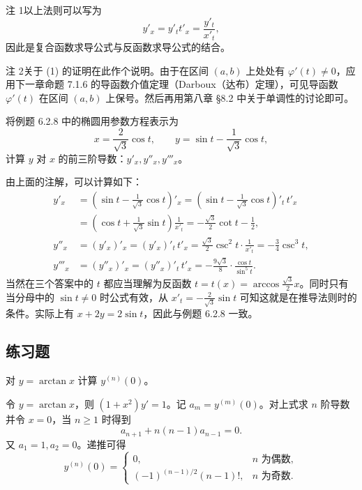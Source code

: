 \begin{xremark}
注 1\quad 以上法则可以写为
\[
  y'_x=y'_t t'_x=\frac{y'_t}{x'_t},
\]
因此是复合函数求导公式与反函数求导公式的结合。

注 2\quad 关于 (1) 的证明在此作个说明。由于在区间 $(a,b)$ 上处处有 $\varphi'(t)\ne0$，应用下一章命题 7.1.6 的导函数介值定理（Darboux（达布）定理），可见导函数 $\varphi'(t)$ 在区间 $(a,b)$ 上保号。然后再用第八章 §8.2 中关于单调性的讨论即可。
\end{xremark}

\begin{xexample}[6.2.9]
将例题 6.2.8 中的椭圆用参数方程表示为
\[
  x=\frac2{\sqrt3}\cos t,\qquad y=\sin t-\frac1{\sqrt3}\cos t,
\]
计算 $y$ 对 $x$ 的前三阶导数：$y'_x,y''_x,y'''_x$。
\end{xexample}
\begin{xsolution}
由上面的注解，可以计算如下：
\begin{align*}
  y'_x
  &=\left(\sin t-\frac1{\sqrt3}\cos t\right)'_x
   =\left(\sin t-\frac1{\sqrt3}\cos t\right)'_t\,t'_x\\
  &=\left(\cos t+\frac1{\sqrt3}\sin t\right)\frac1{x'_t}
   =-\frac{\sqrt3}{2}\cot t-\frac12,\\
  y''_x
  &=(y'_x)'_x=(y'_x)'_t\,t'_x
   =\frac{\sqrt3}{2}\csc^2t\cdot\frac1{x'_t}
   =-\frac34\csc^3t,\\
  y'''_x
  &=(y''_x)'_x=(y''_x)'_t\,t'_x
   =-\frac{9\sqrt3}{8}\cdot\frac{\cos t}{\sin^5t}.
\end{align*}
当然在三个答案中的 $t$ 都应当理解为反函数 $t=t(x)=\arccos\frac{\sqrt3}{2}x$。同时只有当分母中的 $\sin t\ne0$ 时公式有效，从 $x'_t=-\frac2{\sqrt3}\sin t$ 可知这就是在推导法则时的条件。实际上有 $x+2y=2\sin t$，因此与例题 6.2.8 一致。
\end{xsolution}

\subsection{练习题}

\begin{xexercise}[1]
对 $y=\arctan x$ 计算 $y^{(n)}(0)$。
\end{xexercise}
\begin{xsolution}
令 $y=\arctan x$，则 $(1+x^2)y'=1$。记 $a_m=y^{(m)}(0)$。对上式求 $n$ 阶导数并令 $x=0$，当 $n\ge1$ 时得到
\[
  a_{n+1}+n(n-1)a_{n-1}=0.
\]
又 $a_1=1,a_2=0$。递推可得
\[
  \boxed{
  y^{(n)}(0)=
  \begin{cases}
    0,&n\text{ 为偶数},\\
    (-1)^{(n-1)/2}(n-1)!,&n\text{ 为奇数}.
  \end{cases}}
\]
\end{xsolution}


